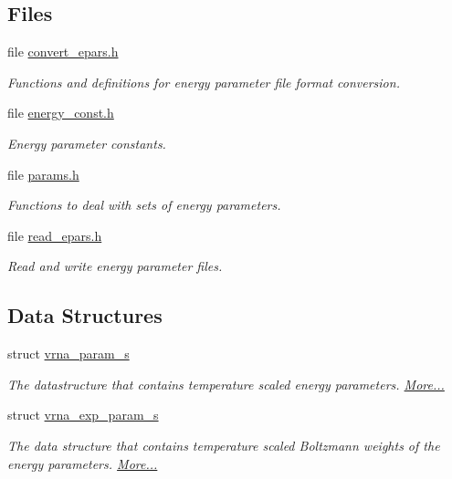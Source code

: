 \subsection*{Files}
\begin{DoxyCompactItemize}
\item 
file \hyperlink{convert__epars_8h}{convert\+\_\+epars.\+h}
\begin{DoxyCompactList}\small\item\em Functions and definitions for energy parameter file format conversion. \end{DoxyCompactList}\item 
file \hyperlink{energy__const_8h}{energy\+\_\+const.\+h}
\begin{DoxyCompactList}\small\item\em Energy parameter constants. \end{DoxyCompactList}\item 
file \hyperlink{params_8h}{params.\+h}
\begin{DoxyCompactList}\small\item\em Functions to deal with sets of energy parameters. \end{DoxyCompactList}\item 
file \hyperlink{read__epars_8h}{read\+\_\+epars.\+h}
\begin{DoxyCompactList}\small\item\em Read and write energy parameter files. \end{DoxyCompactList}\end{DoxyCompactItemize}
\subsection*{Data Structures}
\begin{DoxyCompactItemize}
\item 
struct \hyperlink{group__energy__parameters_structvrna__param__s}{vrna\+\_\+param\+\_\+s}
\begin{DoxyCompactList}\small\item\em The datastructure that contains temperature scaled energy parameters.  \hyperlink{group__energy__parameters_structvrna__param__s}{More...}\end{DoxyCompactList}\item 
struct \hyperlink{group__energy__parameters_structvrna__exp__param__s}{vrna\+\_\+exp\+\_\+param\+\_\+s}
\begin{DoxyCompactList}\small\item\em The data structure that contains temperature scaled Boltzmann weights of the energy parameters.  \hyperlink{group__energy__parameters_structvrna__exp__param__s}{More...}\end{DoxyCompactList}\end{DoxyCompactItemize}
